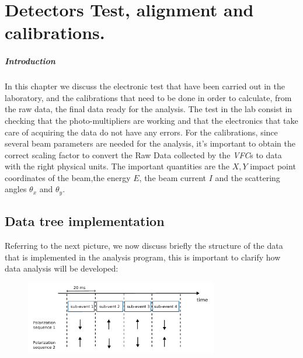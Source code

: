 \chapter{Detectors Test, alignment and calibrations.} \label{analysis}

\paragraph{Introduction}
In this chapter we discuss the electronic test that have been carried out in the laboratory, and the calibrations that need to be done
in order to calculate, from the raw data, the final data ready for the analysis.
The test in the lab consist in checking that the photo-multipliers are working and that the electronics that take care of acquiring the data do not have any errors.
For the calibrations, since several beam parameters are needed for the analysis, it's important to obtain the correct scaling factor to convert the Raw Data collected by the \textit{VFC}s to data with the right physical units. The important quantities are the $X,Y$ impact point coordinates of the beam,the energy $E$, the beam current $I$ and the scattering angles $\theta_{x}$ and $\theta_{y}$.

\section{Data tree implementation}

Referring to the next picture, we now discuss briefly the structure of the data that is implemented in the analysis program, this is important to clarify how data analysis will be developed:

\begin{figure}[hbtp]
\centering
\includegraphics[width = 0.75\textwidth]{ExperimentalSetup/EventStructure.pdf}
\caption{}
\end{figure}

